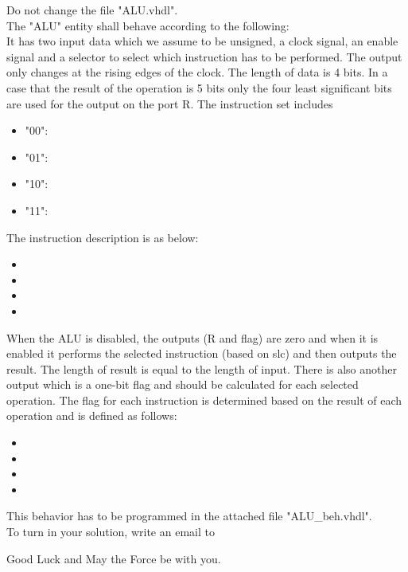\documentclass[a4paper,12pt]{article}
\begin{document}
Do not change the file "ALU.vhdl".
\\

The "ALU" entity shall behave according to the following:
\\
It has two input data which we assume to be unsigned, a clock signal, an enable signal and a selector to select which instruction has to be performed. The output only changes at the rising edges of the clock. The length of data is 4 bits. In a case that the result of the operation is 5 bits only the four least significant bits are used for the output on the port R. The instruction set includes %
\\
\begin{itemize}
\item "00": %
\item "01": %
\item "10": %
\item "11": %
\end{itemize}
\vspace{0.3cm}

The instruction description is as below:
\begin{itemize}
\item %
\item %
\item %
\item %
\end{itemize}
\vspace{0.3cm}

When the ALU is disabled, the outputs (R and flag) are zero and when it is enabled it performs the selected instruction (based on slc) and then outputs the result. The length of result is equal to the length of input. There is also another output which is a one-bit flag and should be calculated for each selected operation. The flag for each instruction is determined based on the result of each operation and is defined as follows:
\begin{itemize}
\item %
\item %
\item %
\item %
\end{itemize}
\vspace{0.3cm}

This behavior has to be programmed in the attached file "ALU\_beh.vhdl". 
\\

To turn in your solution, write an email to %

\vspace{0.7cm}

Good Luck and May the Force be with you.
\end{document}
